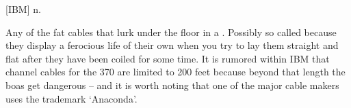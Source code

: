  {[}IBM] n.

Any of the fat cables that lurk under the floor in a .
Possibly so called because they display a ferocious life of their own when you
try to lay them straight and flat after they have been coiled for some time. It
is rumored within IBM that channel cables for the 370 are limited to 200 feet
because beyond that length the boas get dangerous -- and it is worth noting that
one of the major cable makers uses the trademark `Anaconda'.

